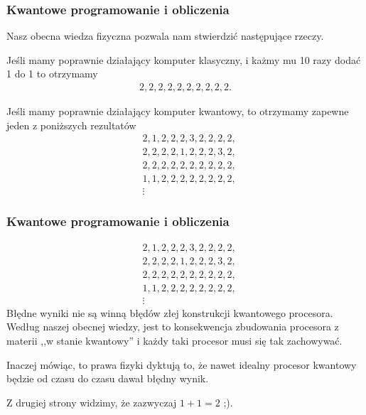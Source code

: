 \documentclass[10pt,t]{beamer}
\begin{document}
\begin{frame}
  \frametitle{Kwantowe programowanie i obliczenia}


  Nasz obecna wiedza fizyczna pozwala nam stwierdzić następujące
  rzeczy.

  Jeśli mamy poprawnie działający komputer klasyczny, i każmy mu 10
  razy dodać 1 do 1 to otrzymamy
  \begin{align*}
    2, 2, 2, 2, 2, 2, 2, 2, 2, 2.
  \end{align*}

  Jeśli mamy poprawnie działający komputer kwantowy, to otrzymamy
  zapewne jeden z poniższych rezultatów
  \begin{align*}
    &2, 1, 2, 2, 2, 3, 2, 2, 2, 2, \\
    &2, 2, 2, 2, 1, 2, 2, 2, 3, 2, \\
    &2, 2, 2, 2, 2, 2, 2, 2, 2, 2, \\
    &1, 1, 2, 2, 2, 2, 2, 2, 2, 2, \\
    &\vdots
  \end{align*}

\end{frame}





\begin{frame}
  \frametitle{Kwantowe programowanie i obliczenia}


  \begin{align*}
    &2, 1, 2, 2, 2, 3, 2, 2, 2, 2, \\
    &2, 2, 2, 2, 1, 2, 2, 2, 3, 2, \\
    &2, 2, 2, 2, 2, 2, 2, 2, 2, 2, \\
    &1, 1, 2, 2, 2, 2, 2, 2, 2, 2, \\
    &\vdots
  \end{align*}
  Błędne wyniki \alert{nie} są winną błędów złej konstrukcji
  kwantowego procesora. Według naszej obecnej wiedzy, jest to
  konsekwencja zbudowania procesora z materii ,,w stanie kwantowy''
  i każdy taki procesor musi się tak zachowywać.

  Inaczej mówiąc, to prawa fizyki dyktują to, że nawet idealny
  procesor kwantowy będzie od czasu do czasu dawał błędny wynik.

  Z drugiej strony widzimy, że zazwyczaj $1 + 1 = 2$ ;).

\end{frame}
\end{document}

